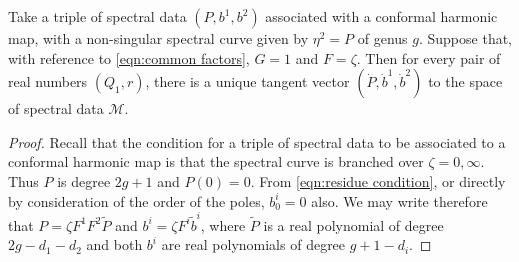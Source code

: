 \begin{lem}[Case \ref{case:vi}: conformal, $F=ζ$, $G=1$]
    \label{lem:tangent conformal}
Take a triple of spectral data $(P,b^1,b^2)$ associated with a conformal harmonic map, with a non-singular spectral curve given by $η^2 = P$ of genus $g$. Suppose that, with reference to \eqref{eqn:common factors}, $G=1$ and $F=ζ$. Then for every pair of real numbers $(Q_1,r)$, there is a unique tangent vector $(\dot P, \dot b^1, \dot b^2)$ to the space of spectral data $\mathcal{M}$.

\begin{proof}
Recall that the condition for a triple of spectral data to be associated to a conformal harmonic map is that the spectral curve is branched over $ζ=0,\infty$. Thus $P$ is degree $2g+1$ and $P(0)=0$. From \eqref{eqn:residue condition}, or directly by consideration of the order of the poles, $b^i_0 = 0$ also. We may write therefore that $P= ζF^1F^2\tilde{P}$ and $b^i = ζF^i \tilde{b}^i$, where $\tilde{P}$ is a real polynomial of degree $2g - d_1 - d_2$ and both $b^i$ are real polynomials of degree $g+1-d_i$.


\end{proof}
\end{lem}

